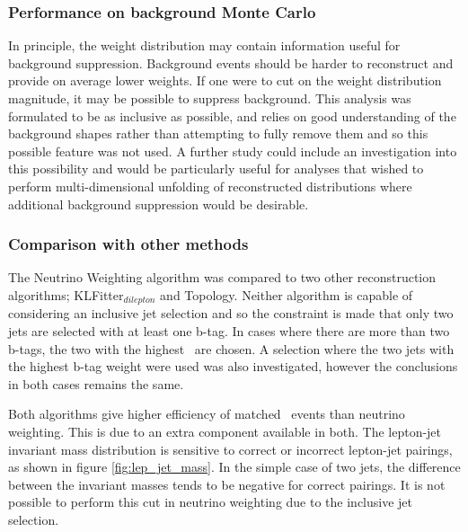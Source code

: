 \subsubsection{Performance on background Monte Carlo}
In principle, the weight distribution may contain information useful for background suppression. Background events should be harder to reconstruct and provide on average lower weights. If one were to cut on the weight distribution magnitude, it may be possible to suppress background. This analysis was formulated to be as inclusive as possible, and relies on good understanding of the background shapes rather than attempting to fully remove them and so this possible feature was not used. A further study could include an investigation into this possibility and would be particularly useful for analyses that wished to perform multi-dimensional unfolding of reconstructed distributions where additional background suppression would be desirable. 

\subsubsection{Comparison with other methods}
\label{sec:reco_comparison}
The Neutrino Weighting algorithm was compared to two other reconstruction algorithms; KLFitter$_{dilepton}$ and Topology. Neither algorithm is capable of considering an inclusive jet selection and so the constraint is made that only two jets are selected with at least one b-tag. In cases where there are more than two b-tags, the two with the highest \pt\ are chosen. A selection where the two jets with the highest b-tag weight were used was also investigated, however the conclusions in both cases remains the same.

Both algorithms give higher efficiency of matched \ttbar\ events than neutrino weighting. This is due to an extra component available in both. The lepton-jet invariant mass distribution is sensitive to correct or incorrect lepton-jet pairings, as shown in figure \ref{fig:lep_jet_mass}. In the simple case of two jets, the difference between the invariant masses tends to be negative for correct pairings. It is not possible to perform this cut in neutrino weighting due to the inclusive jet selection. 

